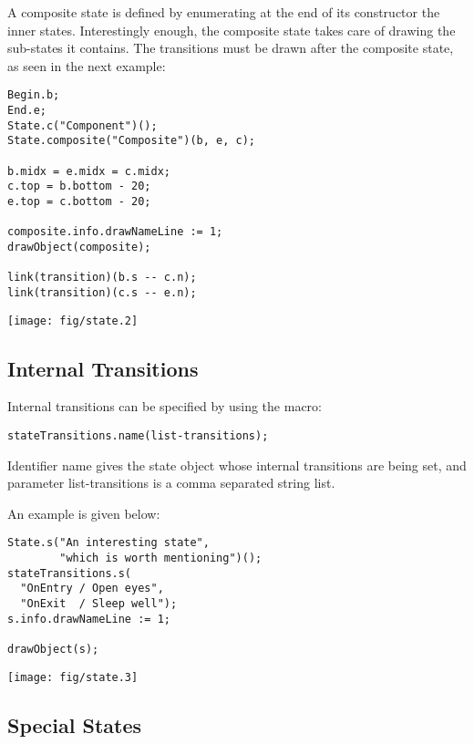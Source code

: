 \documentclass{article}
\newcommand{\code}{\ttfamily}
\begin{document}
A composite state is defined by enumerating at the end of its constructor the inner
states. Interestingly enough, the composite state takes care of drawing the sub-states it
contains. The transitions must be drawn after the composite state, as seen in the
next example:

\begin{multicols}{2}
\begin{verbatim}
Begin.b;
End.e;
State.c("Component")();
State.composite("Composite")(b, e, c);

b.midx = e.midx = c.midx;
c.top = b.bottom - 20;
e.top = c.bottom - 20;

composite.info.drawNameLine := 1;
drawObject(composite);

link(transition)(b.s -- c.n);
link(transition)(c.s -- e.n);
\end{verbatim}
\columnbreak
\hspace{1cm}\texttt{[image: fig/state.2]}
\end{multicols}

\subsection{Internal Transitions}

Internal transitions can be specified by using the macro:
\begin{verbatim}
stateTransitions.name(list-transitions);
\end{verbatim}

Identifier {\code name} gives the state object whose internal transitions are being set,
and parameter {\code list-transitions} is a comma separated string list.


An example is given below:

\begin{multicols}{2}
\begin{verbatim}
State.s("An interesting state",
        "which is worth mentioning")();
stateTransitions.s(
  "OnEntry / Open eyes",
  "OnExit  / Sleep well");
s.info.drawNameLine := 1;

drawObject(s);
\end{verbatim}
\columnbreak
\hspace{1cm}\texttt{[image: fig/state.3]}
\end{multicols}

\subsection{Special States}
\end{document}
